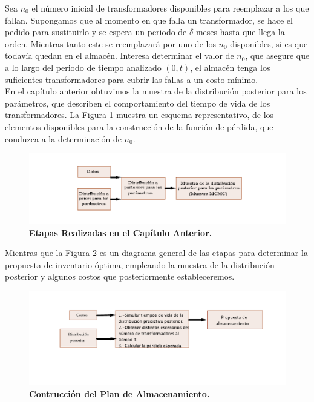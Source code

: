 \noindent Sea $n_0$ el n\'umero inicial de transformadores disponibles para reemplazar a los que fallan. Supongamos que al momento en que falla un transformador, se hace el pedido para sustituirlo y se espera un periodo de $\delta$ meses hasta que llega la orden. Mientras tanto este se reemplazar\'a por uno de los $n_0$ disponibles, si es que todav\'ia quedan en el almac\'en. Interesa determinar el valor de $n_0$, que asegure que a lo largo del periodo de tiempo analizado $(0,t)$, el almac\'en tenga los suficientes transformadores para cubrir las fallas a un costo m\'inimo.\\[0.2cm]
\noindent En el cap\'itulo anterior obtuvimos la muestra de la distribuci\'on posterior para los par\'ametros, que describen el comportamiento del tiempo de vida de los transformadores. La Figura \ref{lo} muestra un esquema representativo, de los elementos disponibles para la construcci\'on de la funci\'on de p\'erdida, que conduzca a la determinaci\'on de $n_0$.
\begin{figure}[h!]
\hspace{-2 cm}
\includegraphics[scale=1.2]{esq.pdf}
\vspace{-1.5cm}\caption{\bf Etapas Realizadas en el Cap\'itulo Anterior.}\label{lo}
\end{figure}
\noindent Mientras que la Figura \ref{op} es un diagrama general de las etapas para  determinar la propuesta de inventario \'optima, empleando  la muestra de la distribuci\'on posterior y algunos costos que posteriormente estableceremos.

\begin{figure}[h!]
\hspace{-1 cm}\includegraphics[scale=0.7]{final.pdf}
\vspace{-2.4 cm}\caption{\bf Contrucci\'on del Plan de Almacenamiento.}\label{op}
\end{figure}


